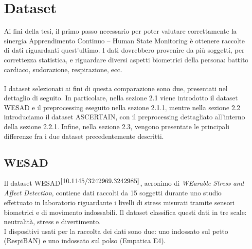 \chapter{Dataset}
Ai fini della tesi, il primo passo necessario per poter valutare correttamente la sinergia Apprendimento Continuo -- Human State Monitoring è ottenere raccolte di dati riguardanti quest'ultimo. I dati dovrebbero provenire da più soggetti, per correttezza statistica, e riguardare diversi aspetti biometrici della persona: battito cardiaco, sudorazione, respirazione, ecc.\\\\
I dataset selezionati ai fini di questa comparazione sono due, presentati nel dettaglio di seguito. In particolare, nella sezione 2.1 viene introdotto il dataset WESAD e il preprocessing eseguito nella sezione 2.1.1, mentre nella sezione 2.2 introduciamo il dataset ASCERTAIN, con il preprocessing dettagliato all'interno della sezione 2.2.1. Infine, nella sezione 2.3, vengono presentate le principali differenze fra i due dataset precedentemente descritti.
\section{WESAD}
Il dataset WESAD$^{\cite{10.1145/3242969.3242985}}$, acronimo di \textit{WEarable Stress and Affect Detection}, contiene dati raccolti da 15 soggetti durante uno studio effettuato in laboratorio riguardante i livelli di stress misurati tramite sensori biometrici e di movimento indossabili. Il dataset classifica questi dati in tre scale: neutralità, stress e divertimento.\\
I dispositivi usati per la raccolta dei dati sono due: uno indossato sul petto (RespiBAN) e uno indossato sul polso (Empatica E4).\\\\
\pagebreak

